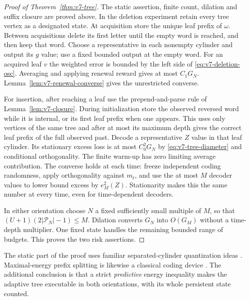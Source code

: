 \begin{proof}[Proof of Theorem~\ref{thm:v7-tree}]
The static assertion, finite count, dilation and suffix closure are
proved above. In the deletion experiment retain every tree vertex as
a designated state. At acquisition store the unique leaf prefix of
$\omega$. Between acquisitions delete its first letter until the empty
word is reached, and then keep that word. Choose a representative in
each nonempty cylinder and output its $g$ value; use a fixed bounded
output at the empty word. For an acquired leaf $v$ the weighted error
is bounded by the left side of \eqref{eq:v7-deletion-osc}. Averaging
and applying renewal reward gives at most $C_1G_N$.
Lemma~\ref{lem:v7-renewal-converse} gives the unrestricted converse.

For insertion, after reaching a leaf use the prepend-and-parse rule of
Lemma~\ref{lem:v7-closure}. During initialization store the observed
reversed word while it is internal, or its first leaf prefix when one
appears. This uses only vertices of the same tree and after at most its
maximum depth gives the correct leaf prefix of the full observed past.
Decode a representative $Z$ value in that leaf cylinder. Its stationary
excess loss is at most $C_0^2G_N$ by
\eqref{eq:v7-tree-diameter} and conditional orthogonality. The finite
warm-up has zero limiting average contribution. The converse holds at
each time: freeze independent coding randomness, apply orthogonality
against $m_t$, and use the at most $M$ decoder values to lower bound
excess by $e_M^2(Z)$. Stationarity makes this the same number at every
time, even for time-dependent decoders.

In either orientation choose $N$ a fixed sufficiently small multiple
of $M$, so that $(U+1)(2|\mathcal P_N|-1)\le M$. Dilation converts
$G_N$ into $O(G_M)$ without a time-depth multiplier. One fixed state
handles the remaining bounded range of budgets. This proves the two
risk assertions.
\end{proof}

The static part of the proof uses familiar separated-cylinder
quantization ideas \cite{KZ2017,Roychowdhury2014}. Maximal-energy
prefix splitting is likewise a classical coding device
\cite{Tunstall1967}. The additional conclusion is that a strict
\emph{predictive} energy inequality makes the adaptive tree executable
in both orientations, with its whole persistent state counted.
